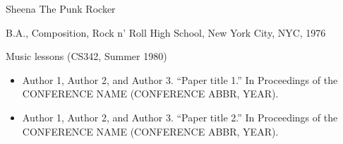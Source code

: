 \vita
\begin{singlespace}
    \begin{description}[labelwidth=4cm,leftmargin=4.2cm,itemsep=1em]

        \item[NAME] Sheena The Punk Rocker

        \item[EDUCATION] B.A., Composition, Rock n' Roll High School, New York City, NYC, 1976

        \item[TEACHING] Music lessons (CS342, Summer 1980)

        \item[PUBLICATIONS]
            \begin{itemize}[label={},listparindent=0pt,itemindent=0pt,leftmargin=0pt,itemsep=1em,parsep=0pt,topsep=0pt,partopsep=0pt]

                \item Author 1, Author 2, and Author 3. %
                ``Paper title 1.'' %
                In Proceedings of the CONFERENCE NAME (CONFERENCE ABBR, YEAR).

                \item Author 1, Author 2, and Author 3. %
                ``Paper title 2.'' %
                In Proceedings of the CONFERENCE NAME (CONFERENCE ABBR, YEAR).

            \end{itemize}
    \end{description}
\end{singlespace}
